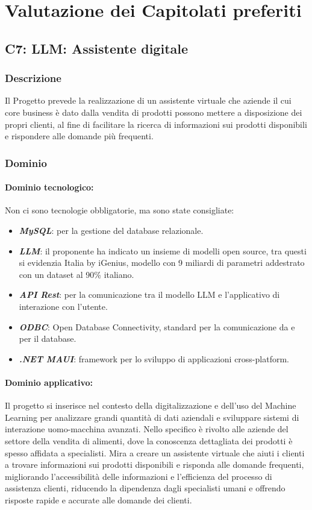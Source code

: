 \section{Valutazione dei Capitolati preferiti}


\subsection{C7: LLM: Assistente digitale}

\subsubsection{Descrizione}
Il Progetto prevede la realizzazione di un assistente virtuale 
che aziende il cui core business è dato dalla vendita di prodotti 
possono mettere a disposizione dei propri clienti, 
al fine di facilitare la ricerca di informazioni sui prodotti disponibili 
e rispondere alle domande più frequenti.
\subsubsection{Dominio}
\paragraph{Dominio tecnologico:}
Non ci sono tecnologie obbligatorie, ma sono state consigliate:
\begin{itemize}
    \item \textit{\textbf{MySQL}}: per la gestione del database relazionale.
    \item \textit{\textbf{LLM}}: il proponente ha indicato un insieme di modelli open source, tra questi si evidenzia Italia by iGenius, modello con 9 miliardi di parametri addestrato con un dataset al 90\% italiano.
    \item \textit{\textbf{API Rest}}: per la comunicazione tra il modello LLM e l'applicativo di interazione con l'utente.
    \item \textit{\textbf{ODBC}}: Open Database Connectivity, standard per la comunicazione da e per il database.
    \item \textit{\textbf{.NET MAUI}}: framework per lo sviluppo di applicazioni cross-platform.
\end{itemize}
\paragraph{Dominio applicativo:}
Il progetto si inserisce nel contesto della digitalizzazione e dell’uso del Machine Learning 
per analizzare grandi quantità di dati aziendali e sviluppare sistemi di interazione uomo-macchina avanzati. 
Nello specifico è rivolto alle aziende del settore della vendita di alimenti, 
dove la conoscenza dettagliata dei prodotti è spesso affidata a specialisti. 
Mira a creare un assistente virtuale che aiuti i clienti a trovare informazioni sui prodotti disponibili 
e risponda alle domande frequenti, migliorando l’accessibilità delle informazioni 
e l’efficienza del processo di assistenza clienti, riducendo la dipendenza dagli specialisti umani 
e offrendo risposte rapide e accurate alle domande dei clienti.
